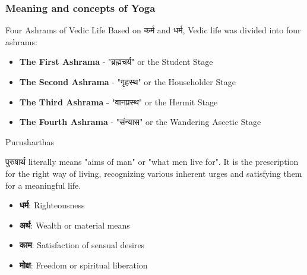 \begin{frame}[fragile]\frametitle{Meaning and concepts of Yoga}
Four Ashrams of Vedic Life
          Based on कर्म and धर्म, Vedic life was divided into four ashrams: 
          \begin{itemize}
            \item \textbf{The First Ashrama} - "ब्रह्मचर्य" or the Student Stage
            \item \textbf{The Second Ashrama} - "गृहस्थ" or the Householder Stage
            \item \textbf{The Third Ashrama} - "वानप्रस्थ" or the Hermit Stage
            \item \textbf{The Fourth Ashrama} - "संन्यास" or the Wandering Ascetic Stage
          \end{itemize}
		  
Purusharthas
          
          पुरुषार्थ literally means "aims of man" or "what men live for". It is the prescription for the right way of living, recognizing various inherent urges and satisfying them for a meaningful life.
          
          \begin{itemize}
            \item \textbf{धर्म}: Righteousness
            \item \textbf{अर्थ}: Wealth or material means
            \item \textbf{काम}: Satisfaction of sensual desires
            \item \textbf{मोक्ष}: Freedom or spiritual liberation
          \end{itemize}
\end{frame}

